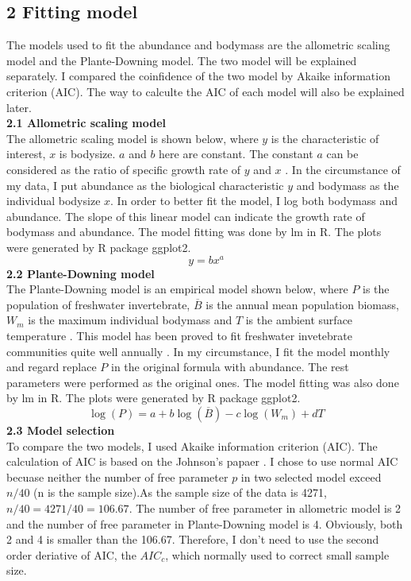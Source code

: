 \documentclass[11pt]{article}
\begin{document}
\begin{linenumbers}
\section*{2 Fitting model}
The models used to fit the abundance and bodymass are the allometric scaling model and the Plante-Downing model. The two model will be explained separately.
I compared the coinfidence of the two model by Akaike information criterion (AIC). The way to calculte the AIC of each model will also be explained later.   \\
\textbf{2.1 Allometric scaling model} \\
The allometric scaling model is shown below, where $y$ is the characteristic of interest, $x$ is bodysize. $a$ and $b$ here are constant.
The constant $a$ can be considered as the ratio of specific growth rate of $y$ and $x$ \cite{huxley1950relative}.
In the circumstance of my data, I put abundance as the biological characteristic $y$ and bodymass as the individual bodysize $x$.
In order to better fit the model, I log both bodymass and abundance.
The slope of this linear model can indicate the growth rate of bodymass and abundance.
The model fitting was done by lm in R. The plots were generated by R package ggplot2.
\begin{equation}
     y= b x^a
\end{equation}
\textbf{2.2 Plante-Downing model} \\
The Plante-Downing model is an empirical model shown below, where $P$ is the population of freshwater invertebrate, $\overline{B}$ is the annual mean population biomass, $\mathit{W}_{m}$ is the maximum individual bodymass and $T$ is the ambient surface temperature \cite{plante1989production}.
This model has been proved to fit freshwater invetebrate communities quite well annually \cite{plante1989production}.
In my circumstance, I fit the model monthly and regard replace $P$ in the original formula with abundance. The rest parameters were performed as the original ones. The model fitting was also done by lm in R. The plots were generated by R package ggplot2.
\begin{equation}
     \log(P) = a +b \log(\overline{B}) - c \log(\mathit{W}_{m}) + d T
\end{equation}
\textbf{2.3 Model selection} \\
To compare the two models, I used Akaike information criterion (AIC). The calculation of AIC is based on the Johnson's papaer \cite{johnson2004model}. I chose to use normal AIC becuase neither the number of free parameter $p$ in two selected model exceed $n/40$ (n is the sample size).As the sample size of the data is 4271,  $n/40 =4271/40 = 106.67 $. The number of free parameter in allometric model is 2 and the number of free parameter in Plante-Downing model is 4. Obviously, both 2 and 4 is smaller than the 106.67. Therefore, I don't need to use the second order deriative of AIC, the $\mathit{AIC}_{c}$, which normally used to correct small sample size. \\

\end{linenumbers}
\end{document}
